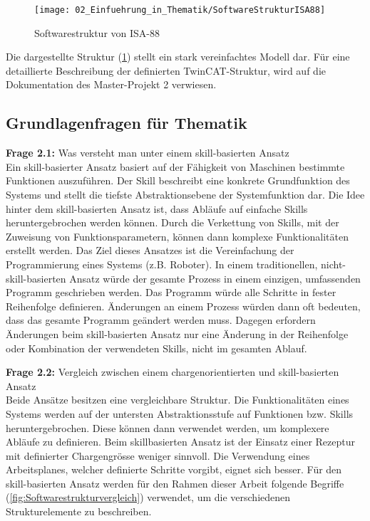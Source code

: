 		\begin{figure}[h!]
			\centering
			\texttt{[image: 02\_Einfuehrung\_in\_Thematik/SoftwareStrukturISA88]}
			\captionsetup{justification=centering}
			\caption{Softwarestruktur von ISA-88}
			\label{fig:Softwarestruktur_ISA88}
		\end{figure}
		
		Die dargestellte Struktur (\ref{fig:Softwarestruktur_ISA88}) stellt ein stark vereinfachtes Modell dar. Für eine detaillierte Beschreibung der definierten TwinCAT-Struktur, wird auf die Dokumentation des Master-Projekt 2 verwiesen.
		
	\vspace{3mm}
	
	\subsection{Grundlagenfragen für Thematik} \label{Grundlagenfragen für Thematik}
	
	\textbf{Frage 2.1:} Was versteht man unter einem skill-basierten Ansatz \vspace{2mm} 
	\\
		Ein skill-basierter Ansatz basiert auf der Fähigkeit von Maschinen bestimmte Funktionen auszuführen. Der Skill beschreibt eine konkrete Grundfunktion des Systems und stellt die tiefste Abstraktionsebene der Systemfunktion dar. Die Idee hinter dem skill-basierten Ansatz ist, dass Abläufe auf einfache Skills heruntergebrochen werden können. Durch die Verkettung von Skills, mit der Zuweisung von Funktionsparametern, können dann komplexe Funktionalitäten erstellt werden. Das Ziel dieses Ansatzes ist die Vereinfachung der Programmierung eines Systems (z.B. Roboter). In einem traditionellen, nicht-skill-basierten Ansatz würde der gesamte Prozess in einem einzigen, umfassenden Programm geschrieben werden. Das Programm würde alle Schritte in fester Reihenfolge definieren. Änderungen an einem Prozess würden dann oft bedeuten, dass das gesamte Programm geändert werden muss. Dagegen erfordern Änderungen beim skill-basierten Ansatz nur eine Änderung in der Reihenfolge oder Kombination der verwendeten Skills, nicht im gesamten Ablauf.
	\vspace{3mm}
	
	\textbf{Frage 2.2:} Vergleich zwischen einem chargenorientierten und skill-basierten Ansatz \vspace{2mm} 
	\\
		Beide Ansätze besitzen eine vergleichbare Struktur. Die Funktionalitäten eines Systems werden auf der untersten Abstraktionsstufe auf Funktionen bzw. Skills heruntergebrochen. Diese können dann verwendet werden, um komplexere Abläufe zu definieren. Beim skillbasierten Ansatz ist der Einsatz einer Rezeptur mit definierter Chargengrösse weniger sinnvoll. Die Verwendung eines Arbeitsplanes, welcher definierte Schritte vorgibt, eignet sich besser.
		Für den skill-basierten Ansatz werden für den Rahmen dieser Arbeit folgende Begriffe (\ref{fig:Softwarestrukturvergleich}) verwendet, um die verschiedenen Strukturelemente zu beschreiben. 
	
